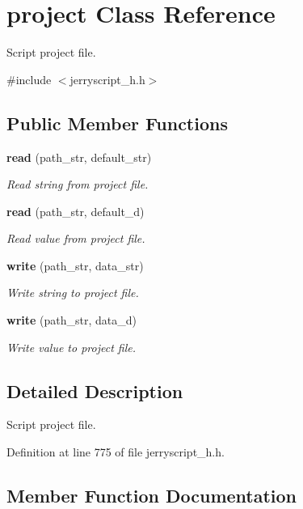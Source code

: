 \section{project Class Reference}
\label{classproject}


Script project file.  




{\ttfamily \#include $<$jerryscript\+\_\+h.\+h$>$}

\subsection*{Public Member Functions}
\begin{DoxyCompactItemize}
\item 
\textbf{ read} (path\+\_\+str, default\+\_\+str)
\begin{DoxyCompactList}\small\item\em Read string from project file. \end{DoxyCompactList}\item 
\textbf{ read} (path\+\_\+str, default\+\_\+d)
\begin{DoxyCompactList}\small\item\em Read value from project file. \end{DoxyCompactList}\item 
\textbf{ write} (path\+\_\+str, data\+\_\+str)
\begin{DoxyCompactList}\small\item\em Write string to project file. \end{DoxyCompactList}\item 
\textbf{ write} (path\+\_\+str, data\+\_\+d)
\begin{DoxyCompactList}\small\item\em Write value to project file. \end{DoxyCompactList}\end{DoxyCompactItemize}


\subsection{Detailed Description}
Script project file. 

Definition at line 775 of file jerryscript\+\_\+h.\+h.



\subsection{Member Function Documentation}
\mbox{\label{classproject_a4b87ce8c608d374d8e178f521c20127c}} 
